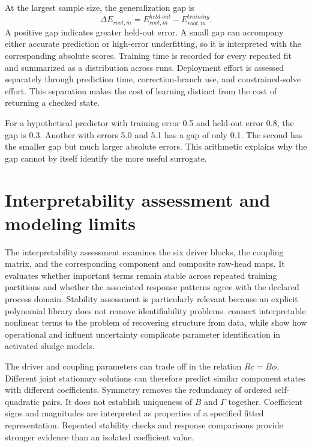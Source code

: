 At the largest sample size, the generalization gap is
\begin{equation}
\label{eq:icsor_generalization_gap}
\Delta E_{root,m}=E_{root,m}^{held\text{-}out}-E_{root,m}^{training}.
\end{equation}
A positive gap indicates greater held-out error. A small gap can accompany either accurate prediction or high-error underfitting, so it is interpreted with the corresponding absolute scores. Training time is recorded for every repeated fit and summarized as a distribution across runs. Deployment effort is assessed separately through prediction time, correction-branch use, and constrained-solve effort. This separation makes the cost of learning distinct from the cost of returning a checked state.

For a hypothetical predictor with training error 0.5 and held-out error 0.8, the gap is 0.3. Another with errors 5.0 and 5.1 has a gap of only 0.1. The second has the smaller gap but much larger absolute errors. This arithmetic explains why the gap cannot by itself identify the more useful surrogate.

\section{Interpretability assessment and modeling limits}

The interpretability assessment examines the six driver blocks, the coupling matrix, and the corresponding component and composite raw-head maps. It evaluates whether important terms remain stable across repeated training partitions and whether the associated response patterns agree with the declared process domain. Stability assessment is particularly relevant because an explicit polynomial library does not remove identifiability problems. \citet{Brunton2016} connect interpretable nonlinear terms to the problem of recovering structure from data, while \citet{Machado2014} show how operational and influent uncertainty complicate parameter identification in activated sludge models.

The driver and coupling parameters can trade off in the relation \(Rc=B\phi\). Different joint stationary solutions can therefore predict similar component states with different coefficients. Symmetry removes the redundancy of ordered self-quadratic pairs. It does not establish uniqueness of \(B\) and \(\Gamma\) together. Coefficient signs and magnitudes are interpreted as properties of a specified fitted representation. Repeated stability checks and response comparisons provide stronger evidence than an isolated coefficient value.

